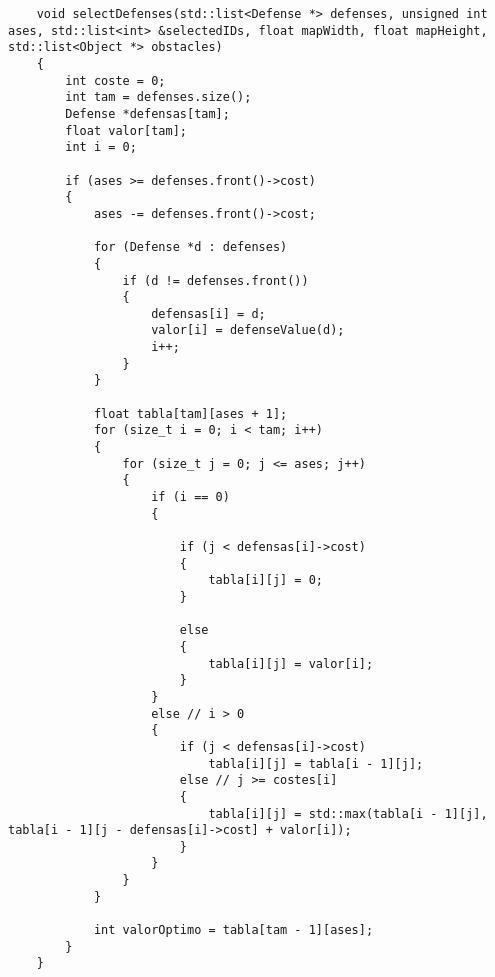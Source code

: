 \begin{lstlisting}
    void selectDefenses(std::list<Defense *> defenses, unsigned int ases, std::list<int> &selectedIDs, float mapWidth, float mapHeight, std::list<Object *> obstacles)
    {
        int coste = 0;
        int tam = defenses.size();
        Defense *defensas[tam];
        float valor[tam];
        int i = 0;
    
        if (ases >= defenses.front()->cost)
        {
            ases -= defenses.front()->cost;
    
            for (Defense *d : defenses)
            {
                if (d != defenses.front())
                {
                    defensas[i] = d;
                    valor[i] = defenseValue(d);
                    i++;
                }
            }
    
            float tabla[tam][ases + 1];
            for (size_t i = 0; i < tam; i++)
            {
                for (size_t j = 0; j <= ases; j++)
                {
                    if (i == 0)
                    {
    
                        if (j < defensas[i]->cost)
                        {
                            tabla[i][j] = 0;
                        }
    
                        else
                        {
                            tabla[i][j] = valor[i];
                        }
                    }
                    else // i > 0
                    {
                        if (j < defensas[i]->cost)
                            tabla[i][j] = tabla[i - 1][j];
                        else // j >= costes[i]
                        {
                            tabla[i][j] = std::max(tabla[i - 1][j], tabla[i - 1][j - defensas[i]->cost] + valor[i]);
                        }
                    }
                }
            }
    
            int valorOptimo = tabla[tam - 1][ases];
        }
    }     
\end{lstlisting}